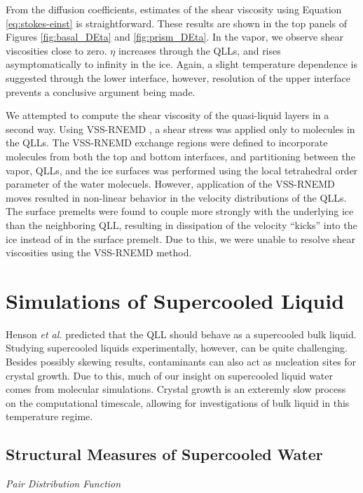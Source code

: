From the diffusion coefficients, estimates of the shear viscosity
using Equation \eqref{eq:stokes-einst} is straightforward. These
results are shown in the top panels of Figures \ref{fig:basal_DEta}
and \ref{fig:prism_DEta}. In the vapor, we observe shear viscosities
close to zero.  $\eta$ increases through the QLLs, and rises
asymptomatically to infinity in the ice. Again, a slight
temperature dependence is suggested through the lower interface,
however, resolution of the upper interface prevents a conclusive
argument being made. 

We attempted to compute the shear viscosity of the quasi-liquid layers
in a second way. Using VSS-RNEMD \cite{Kuang2012}, a shear stress was
applied only to molecules in the QLLs. The VSS-RNEMD exchange regions
were defined to incorporate molecules from both the top and bottom
interfaces, and partitioning between the vapor, QLLs, and the ice
surfaces was performed using the local tetrahedral order parameter of
the water molecuels. However, application of the VSS-RNEMD moves
resulted in non-linear behavior in the velocity distributions of the
QLLs. The surface premelts were found to couple more strongly with the
underlying ice than the neighboring QLL, resulting in dissipation of
the velocity ``kicks'' into the ice instead of in the surface
premelt. Due to this, we were unable to resolve shear viscosities
using the VSS-RNEMD method.



\section{Simulations of Supercooled Liquid}
Henson \textit{et al.} predicted that the QLL should behave as a
supercooled bulk liquid.\cite{Henson2005} Studying supercooled liquids
experimentally, however, can be quite challenging. Besides possibly
skewing results, contaminants can also act as nucleation sites for
crystal growth. Due to this, much of our insight on supercooled liquid
water comes from molecular simulations. Crystal growth is an exteremly
slow process on the computational timescale, allowing for
investigations of bulk liquid in this temperature regime. 

\subsection{Structural Measures of Supercooled Water}

\begin{flushleft}
\textit{Pair Distribution Function}
\end{flushleft}

